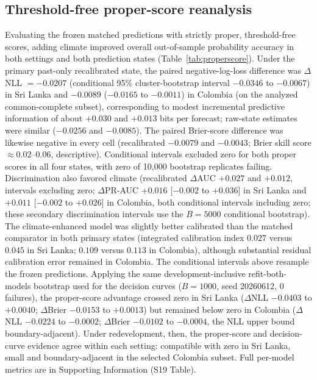 \documentclass[11pt,a4paper]{article}
\begin{document}
\subsection{Threshold-free proper-score reanalysis}
Evaluating the frozen matched predictions with strictly proper, threshold-free scores, adding climate improved overall out-of-sample probability accuracy in both settings and both prediction states (Table~\ref{tab:properscore}). Under the primary past-only recalibrated state, the paired negative-log-loss difference was $\Delta$NLL $=-0.0207$ (conditional 95\% cluster-bootstrap interval $-0.0346$ to $-0.0067$) in Sri Lanka and $-0.0089$ ($-0.0165$ to $-0.0011$) in Colombia (on the analyzed common-complete subset), corresponding to modest incremental predictive information of about $+0.030$ and $+0.013$ bits per forecast; raw-state estimates were similar ($-0.0256$ and $-0.0085$). The paired Brier-score difference was likewise negative in every cell (recalibrated $-0.0079$ and $-0.0043$; Brier skill score $\approx0.02$--$0.06$, descriptive). Conditional intervals excluded zero for both proper scores in all four states, with zero of 10{,}000 bootstrap replicates failing. Discrimination also favored climate (recalibrated $\Delta$AUC $+0.027$ and $+0.012$, intervals excluding zero; $\Delta$PR-AUC $+0.016$ [$-0.002$ to $+0.036$] in Sri Lanka and $+0.011$ [$-0.002$ to $+0.026$] in Colombia, both conditional intervals including zero; these secondary discrimination intervals use the $B=5000$ conditional bootstrap). The climate-enhanced model was slightly better calibrated than the matched comparator in both primary states (integrated calibration index $0.027$ versus $0.045$ in Sri Lanka; $0.109$ versus $0.113$ in Colombia), although substantial residual calibration error remained in Colombia. The conditional intervals above resample the frozen predictions. Applying the same development-inclusive refit-both-models bootstrap used for the decision curves ($B=1000$, seed 20260612, 0 failures), the proper-score advantage crossed zero in Sri Lanka ($\Delta$NLL $-0.0403$ to $+0.0040$; $\Delta$Brier $-0.0153$ to $+0.0013$) but remained below zero in Colombia ($\Delta$NLL $-0.0224$ to $-0.0002$; $\Delta$Brier $-0.0102$ to $-0.0004$, the NLL upper bound boundary-adjacent). Under redevelopment, then, the proper-score and decision-curve evidence agree within each setting: compatible with zero in Sri Lanka, small and boundary-adjacent in the selected Colombia subset. Full per-model metrics are in Supporting Information (S19 Table).
\end{document}

